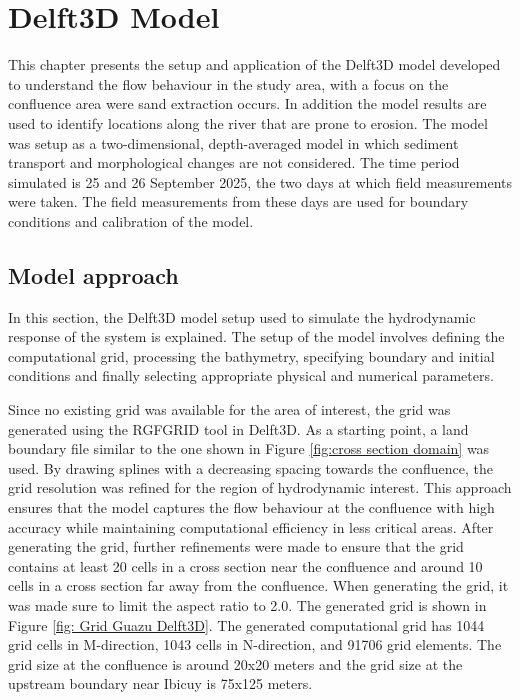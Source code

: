 \chapter{Delft3D Model}
\label{chap:Delft3DModel}
This chapter presents the setup and application of the Delft3D model developed to understand the flow behaviour in the study area, with a focus on the confluence area were sand extraction occurs. In addition the model results are used to identify locations along the river that are prone to erosion. The model was setup as a two-dimensional, depth-averaged model in which sediment transport and morphological changes are not considered. The time period simulated is 25 and 26 September 2025, the two days at which field measurements were taken. The field measurements from these days are used for boundary conditions and calibration of the model.

\section{Model approach}
In this section, the Delft3D model setup used to simulate the hydrodynamic response of the system is explained. The setup of the model involves defining the computational grid, processing the bathymetry, specifying boundary and initial conditions and finally selecting appropriate physical and numerical parameters.

Since no existing grid was available for the area of interest, the grid was generated using the RGFGRID tool in Delft3D. As a starting point, a land boundary file similar to the one shown in Figure \ref{fig:cross section domain} was used. By drawing splines with a decreasing spacing towards the confluence, the grid resolution was refined for the region of hydrodynamic interest. This approach ensures that the model captures the flow behaviour at the confluence with high accuracy while maintaining computational efficiency in less critical areas. After generating the grid, further refinements were made to ensure that the grid contains at least 20 cells in a cross section near the confluence and around 10 cells in a cross section far away from the confluence. When generating the grid, it was made sure to limit the aspect ratio to 2.0. The generated grid is shown in Figure \ref{fig: Grid Guazu Delft3D}. The generated computational grid has 1044 grid cells in M-direction, 1043 cells in N-direction, and 91706 grid elements. The grid size at the confluence is around 20x20 meters and the grid size at the upstream boundary near Ibicuy is 75x125 meters. 

